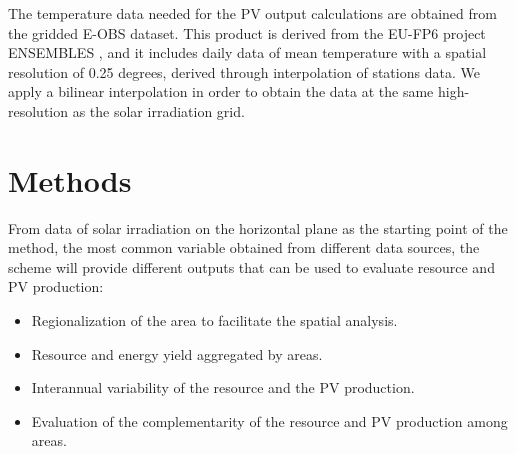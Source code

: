 
The temperature data needed for the PV output calculations are obtained from the gridded E-OBS dataset. This product is derived from the EU-FP6 project ENSEMBLES \cite*{Haylock2008}, and it includes daily data of mean temperature with a spatial resolution of 0.25 degrees, derived through interpolation of stations data. We apply a bilinear interpolation in order to obtain the data at the same high-resolution as the solar irradiation grid. 

\section{Methods}

From data of solar irradiation on the horizontal plane as the starting point of the method, the most common variable obtained from different data sources, the scheme will provide different outputs that can be used to evaluate resource and PV production:

\begin{itemize}
\item Regionalization of the area to facilitate the spatial analysis.
\item Resource and energy yield aggregated by areas.
\item Interannual variability of the resource and the PV production.
\item Evaluation of the complementarity of the resource and PV production among areas.
\end{itemize}  
 
